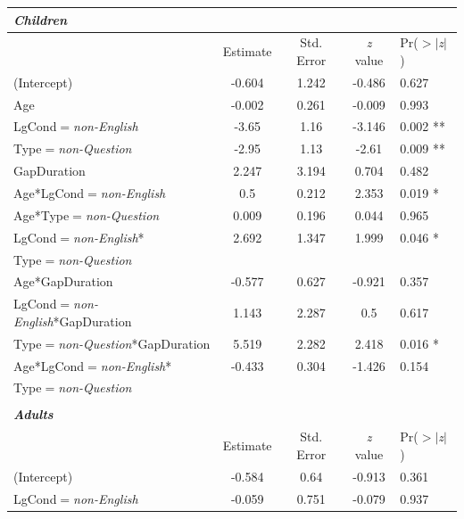 \documentclass[authoryear, 12pt]{elsarticle}
\begin{document}
\linespread{1}
\begin{table}[h!]
\begin{small}
\begin{center}
  \begin{tabular}{lcccl}
  \textbf{\textit{Children}} &&&& \\
    \hline
			           &  Estimate & Std. Error & \textit{z} value & Pr($>$$|$\textit{z}$|$) \\    
    \hline
    (Intercept)   													& -0.604	& 1.242	& -0.486  & 0.627		\\
    Age             												& -0.002	& 0.261	& -0.009  & 0.993		\\
    LgCond$=$\textit{non-English} 						& -3.65		& 1.16	& -3.146  & 0.002 **	\\
    Type$=$\textit{non-Question}      					& -2.95		& 1.13	& -2.61	  & 0.009 **	\\
    GapDuration      											&  2.247	& 3.194	&  0.704  & 0.482		\\
    Age*LgCond$=$\textit{non-English} 					&  0.5		& 0.212	&  2.353  & 0.019 *	\\
    Age*Type$=$\textit{non-Question} 					&  0.009	& 0.196	&  0.044  & 0.965		\\
    LgCond$=$\textit{non-English}*						&  2.692	& 1.347	&  1.999  & 0.046 *	\\
    \hspace*{5mm} Type$=$\textit{non-Question} &&&& \\
    Age*GapDuration												& -0.577	& 0.627	& -0.921  & 0.357		\\
    LgCond$=$\textit{non-English}*GapDuration		&  1.143	& 2.287	&  0.5	  & 0.617		\\
    Type$=$\textit{non-Question}*GapDuration			&  5.519	& 2.282	&  2.418  & 0.016 *	\\
    Age*LgCond$=$\textit{non-English}*					& -0.433	& 0.304	& -1.426  & 0.154		\\
    \hspace*{5mm} Type$=$\textit{non-Question} &&&& \\
    \hline
  &&&& \\
  \textbf{\textit{Adults}} &&&& \\
    \hline
           &  Estimate & Std. Error & \textit{z} value & Pr($>$$|$\textit{z}$|$) \\    
    \hline
    (Intercept)														& -0.584   & 0.64  & -0.913 & 0.361			\\
    LgCond$=$\textit{non-English}							& -0.059   & 0.751 & -0.079 & 0.937			\\

\end{tabular}
\end{center}
\end{small}
\end{table}
\end{document}
